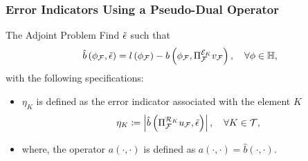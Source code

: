 \begin{frame}
\frametitle{Error Indicators Using a Pseudo-Dual Operator}
    \begin{block}{The Adjoint Problem}
        Find $\tilde{\epsilon}$ such that
      \begin{align}
         \hat{b}\left(\phi_{\mathcal{F}},\tilde{\epsilon}\right)=l\left(\phi_{\mathcal{F}}\right) - b\left(\phi_{\mathcal{F}},\Pi_{\mathcal{F}}^{\mathcal{E}_K} v_{\mathcal{F}}\right), \quad \forall \phi \in \mathbb{H},
        \label{eq:forward_e}
      \end{align}
        with the following specifications:
        \begin{itemize}
            \item $\eta_K$ is defined as the error indicator associated with the element $K$
             \begin{equation}
        		\eta_K \coloneqq \left|\hat{b}\left(\Pi_{\mathcal{F}}^{\mathcal{R}_K} u_{\mathcal{F}}, \tilde{\epsilon}\right)\right|, \quad \forall K \in \mathcal{T},
       		\label{eq:1DGOAupperbound}
     	   \end{equation}
            \item where, the operator $a\left(\cdot ,\cdot\right)$ is defined as $a\left(\cdot ,\cdot\right) = \hat{b}\left(\cdot ,\cdot\right)$.
        \end{itemize}
    \end{block}     
\end{frame}
